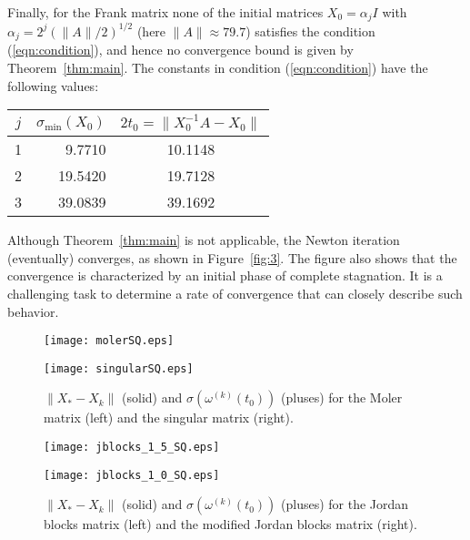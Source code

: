 \documentclass{siamltex}
\begin{document}
Finally, for the Frank matrix none of the initial matrices $X_0=\alpha_j I$
with $\alpha_j=2^j \left(\|A\|/2\right)^{1/2}$ (here $\|A\|\approx 79.7$)
satisfies the condition (\ref{eqn:condition}), and hence no convergence bound
is given by Theorem~\ref{thm:main}. The constants in condition (\ref{eqn:condition})
have the following values:

\smallskip
\begin{center}
\begin{tabular}{c|r|c}
$j$ & $\sigma_{\min}(X_0)$ & $2t_0=\|X_0^{-1}A-X_0\|$ \\\hline
1 & 9.7710  & 10.1148\\
2 & 19.5420 & 19.7128\\
3 & 39.0839 & 39.1692
\end{tabular}
\end{center}

\smallskip
\noindent Although Theorem~\ref{thm:main} is not applicable, the Newton iteration (eventually)
converges, as shown in Figure~\ref{fig:3}. The figure also shows that the convergence is
characterized by an initial phase of complete stagnation. It is a challenging task
to determine a rate of convergence that can closely describe such behavior.

\begin{figure}
\begin{minipage}{0.49\linewidth}
\texttt{[image: molerSQ.eps]}
\end{minipage}
\hfill
\begin{minipage}{0.49\linewidth}
\texttt{[image: singularSQ.eps]}
\end{minipage}
\caption{$\|X_*-X_k\|$ (solid) and $\sigma(\omega^{(k)}(t_0))$ (pluses) for
the Moler matrix (left) and the singular matrix (right).}\label{fig:1}
\end{figure}

\begin{figure}
\begin{minipage}{0.49\linewidth}
\texttt{[image: jblocks\_1\_5\_SQ.eps]}
\end{minipage}
\hfill
\begin{minipage}{0.49\linewidth}
\texttt{[image: jblocks\_1\_0\_SQ.eps]}
\end{minipage}
\caption{$\|X_*-X_k\|$ (solid) and $\sigma(\omega^{(k)}(t_0))$ (pluses) for the Jordan blocks
matrix (left) and the modified Jordan blocks matrix (right). }\label{fig:2}
\end{figure}
\end{document}
